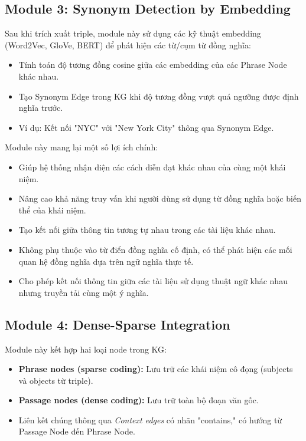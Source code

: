 \documentclass[../main.tex]{subfiles}
\begin{document}
\subsection{Module 3: Synonym Detection by Embedding}
Sau khi trích xuất triple, module này sử dụng các kỹ thuật embedding (Word2Vec, GloVe, BERT) để phát hiện các từ/cụm từ đồng nghĩa:

\begin{itemize}
\item Tính toán độ tương đồng cosine giữa các embedding của các Phrase Node khác nhau.
\item Tạo Synonym Edge trong KG khi độ tương đồng vượt quá ngưỡng được định nghĩa trước.
\item Ví dụ: Kết nối "NYC" với "New York City" thông qua Synonym Edge.
\end{itemize}

Module này mang lại một số lợi ích chính:
\begin{itemize}
\item Giúp hệ thống nhận diện các cách diễn đạt khác nhau của cùng một khái niệm.
\item Nâng cao khả năng truy vấn khi người dùng sử dụng từ đồng nghĩa hoặc biến thể của khái niệm.
\item Tạo kết nối giữa thông tin tương tự nhau trong các tài liệu khác nhau.
\item Không phụ thuộc vào từ điển đồng nghĩa cố định, có thể phát hiện các mối quan hệ đồng nghĩa dựa trên ngữ nghĩa thực tế.
\item Cho phép kết nối thông tin giữa các tài liệu sử dụng thuật ngữ khác nhau nhưng truyền tải cùng một ý nghĩa.
\end{itemize}

\subsection{Module 4: Dense-Sparse Integration}
Module này kết hợp hai loại node trong KG:

\begin{itemize}
\item \textbf{Phrase nodes (sparse coding):} Lưu trữ các khái niệm cô đọng (subjects và objects từ triple).
\item \textbf{Passage nodes (dense coding):} Lưu trữ toàn bộ đoạn văn gốc.
\item Liên kết chúng thông qua \emph{Context edges} có nhãn "contains," có hướng từ Passage Node đến Phrase Node.
\end{itemize}
\end{document}
